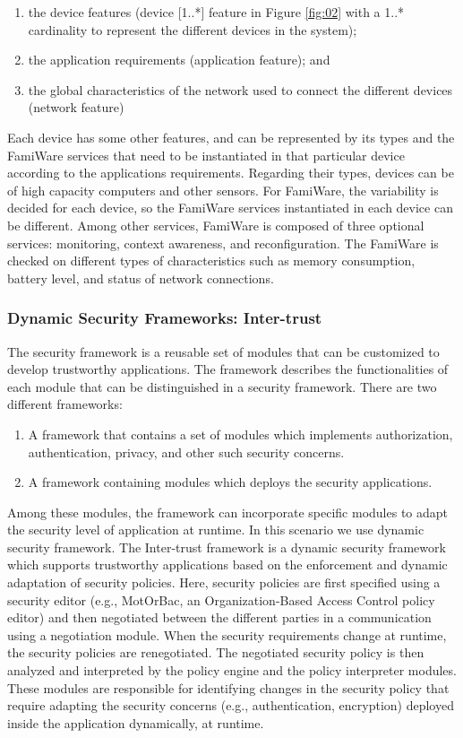 \documentclass[12pt,a4paper,twoside]{report}
\begin{document}
\begin{enumerate}
	\item  the device features (device [1..*] feature in Figure \ref{fig:02} with a 1..* cardinality to represent the different devices in the system); 
	\item the application requirements (application feature); and 
	\item the global characteristics of the network used to connect the different devices (network feature)
\end{enumerate}
Each device has some other features, and can be represented by its types and the FamiWare services that need to be instantiated in that particular device according to the applications requirements. Regarding their types, devices can be of high capacity computers and other sensors. For FamiWare, the variability is decided for each device, so the FamiWare services instantiated in each device can be different. Among other services, FamiWare is composed of three optional services: monitoring, context awareness, and reconfiguration. The FamiWare is checked on different types of characteristics such as memory consumption, battery level, and status of network connections.\par
\subsubsection{Dynamic Security Frameworks: Inter-trust}

The security framework is a reusable set of modules that can be customized to develop trustworthy applications. The framework describes the functionalities of each module that can be distinguished in a security framework. There are two different frameworks:\par

\begin{enumerate}
	\item  A framework that contains a set of modules which implements authorization, authentication, privacy, and other such security concerns.
	\item A framework containing modules which deploys the security applications.
\end{enumerate}
Among these modules, the framework can incorporate specific modules to adapt the security level of application at runtime. In this scenario we use dynamic security framework.
The Inter-trust framework is a dynamic security framework \cite{ayed;etal:2013} which supports trustworthy applications based on the enforcement and dynamic adaptation of security policies. Here, security policies are first specified using a security editor (e.g., MotOrBac, an Organization-Based Access Control policy editor) and then negotiated between the different parties in a communication using a negotiation module. When the security requirements change at runtime, the security policies are renegotiated. The negotiated security policy is then analyzed and interpreted by the policy engine and the policy interpreter modules. These modules are responsible for identifying changes in the security policy that require adapting the security concerns (e.g., authentication, encryption) deployed inside the application dynamically, at runtime.\par
\end{document}
